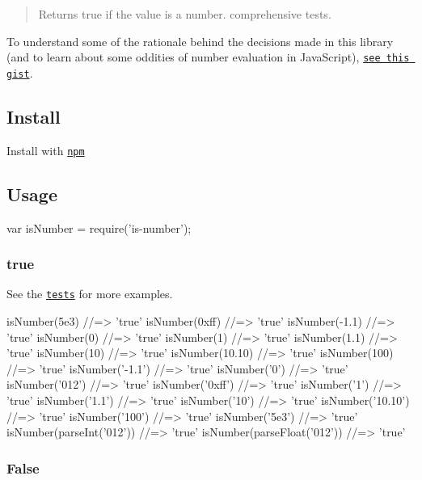 \begin{quote}
Returns true if the value is a number. comprehensive tests. \end{quote}


To understand some of the rationale behind the decisions made in this library (and to learn about some oddities of number evaluation in Java\+Script), \href{https://gist.github.com/jonschlinkert/e30c70c713da325d0e81}{\tt see this gist}.

\subsection*{Install}

Install with \href{https://www.npmjs.com/}{\tt npm}




\subsection*{Usage}


\begin{DoxyCode}
var isNumber = require('is-number');
\end{DoxyCode}


\subsubsection*{true}

See the \href{./test.js}{\tt tests} for more examples.


\begin{DoxyCode}
isNumber(5e3)      //=> 'true'
isNumber(0xff)     //=> 'true'
isNumber(-1.1)     //=> 'true'
isNumber(0)        //=> 'true'
isNumber(1)        //=> 'true'
isNumber(1.1)      //=> 'true'
isNumber(10)       //=> 'true'
isNumber(10.10)    //=> 'true'
isNumber(100)      //=> 'true'
isNumber('-1.1')   //=> 'true'
isNumber('0')      //=> 'true'
isNumber('012')    //=> 'true'
isNumber('0xff')   //=> 'true'
isNumber('1')      //=> 'true'
isNumber('1.1')    //=> 'true'
isNumber('10')     //=> 'true'
isNumber('10.10')  //=> 'true'
isNumber('100')    //=> 'true'
isNumber('5e3')    //=> 'true'
isNumber(parseInt('012'))   //=> 'true'
isNumber(parseFloat('012')) //=> 'true'
\end{DoxyCode}


\subsubsection*{False}

